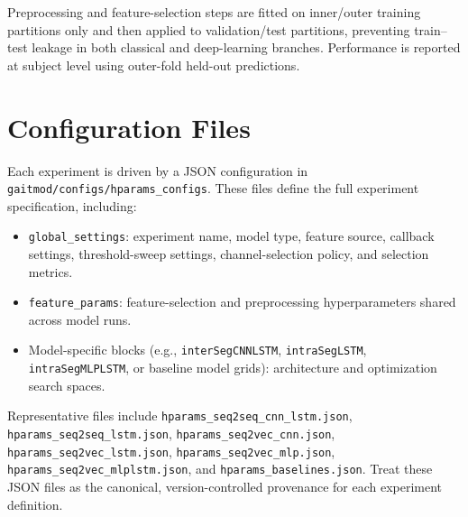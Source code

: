 Preprocessing and feature-selection steps are fitted on inner/outer training partitions only and then applied to validation/test partitions, preventing train--test leakage in both classical and deep-learning branches. Performance is reported at subject level using outer-fold held-out predictions.

\section{Configuration Files}
\label{sec:reproducibility_configuration_files}
Each experiment is driven by a JSON configuration in \texttt{gaitmod/configs/hparams\_configs}. These files define the full experiment specification, including:
\begin{itemize}
\item \texttt{global\_settings}: experiment name, model type, feature source, callback settings, threshold-sweep settings, channel-selection policy, and selection metrics.
\item \texttt{feature\_params}: feature-selection and preprocessing hyperparameters shared across model runs.
\item Model-specific blocks (e.g., \texttt{interSegCNNLSTM}, \texttt{intraSegLSTM}, \texttt{intraSegMLPLSTM}, or baseline model grids): architecture and optimization search spaces.
\end{itemize}
Representative files include \texttt{hparams\_seq2seq\_cnn\_lstm.json}, \texttt{hparams\_seq2seq\_lstm.json}, \texttt{hparams\_seq2vec\_cnn.json}, \texttt{hparams\_seq2vec\_lstm.json}, \texttt{hparams\_seq2vec\_mlp.json}, \texttt{hparams\_seq2vec\_mlplstm.json}, and \texttt{hparams\_baselines.json}. Treat these JSON files as the canonical, version-controlled provenance for each experiment definition.

